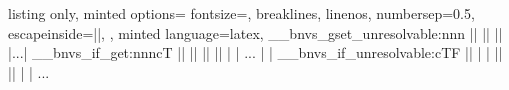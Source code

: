 \begin{tcblisting} {
  listing only,
  minted options={
    fontsize=\small,
    breaklines,
    linenos,
    numbersep=0.5\baselineskip,
    escapeinside=||,
  },
  minted language=latex,
}
\__bnvs_gset_unresolvable:nnn || || ||
|...|
\__bnvs_if_get:nnncT || || || || {
| | ...
| | \__bnvs_if_unresolvable:cTF || {
| |   || } { || }
| | ...
}
\end{tcblisting}

